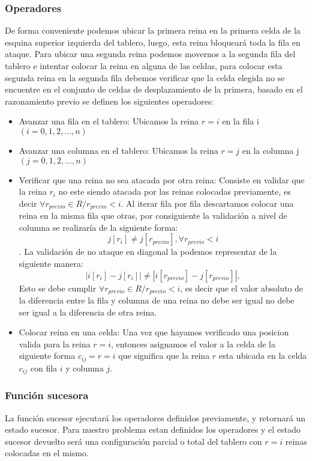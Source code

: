 \documentclass[conference]{IEEEtran}
\begin{document}
\subsubsection{Operadores}\label{AA_4}
De forma conveniente podemos ubicar la primera reina en la primera celda de la esquina superior izquierda del tablero, luego, esta reina bloqueará toda la fila en ataque. Para ubicar una segunda reina podemos movernos a la segunda fila del tablero e intentar colocar la reina en alguna de las celdas, para colocar esta segunda reina en la segunda fila debemos verificar que la celda elegida no se encuentre en el conjunto de celdas de desplazamiento de la primera, basado en el razonamiento previo se definen los siguientes operadores:
\begin{itemize}
\item Avanzar una fila en el tablero: Ubicamos la reina $r=i$ en la fila i $(i = 0, 1, 2,..., n)$
\item Avanzar una columna en el tablero: Ubicamos la reina $r=j$ en la columna j $(j = 0, 1, 2,..., n)$
\item Verificar que una reina no sea atacada por otra reina: Consiste en validar que la reina $r_i$ no este siendo atacada por las reinas colocadas previamente, es decir $\forall r_{previo} \in R / r_{previo}<i$. Al iterar fila por fila descartamos colocar una reina en la misma fila que otras, por consiguiente la validación a nivel de columna se realizaría de la siguiente forma: $$j[r_i] \neq j[r_{previo}], \forall r_{previo}<i$$. La validación de no ataque en diagonal la podemos representar de la siguiente manera: $$|i[r_i]-j[r_i]| \neq |i[r_{previo}]-j[r_{previo}]|,$$ Esto se debe cumplir $\forall r_{previo} \in R / r_{previo}<i$, es decir que el valor absoluto de la diferencia entre la fila y columna de una reina no debe ser igual no debe ser igual a la diferencia de otra reina.
\item Colocar reina en una celda: Una vez que hayamos verificado una posicion valida para la reina $r=i$, entonces asignamos el valor a la celda de la siguiente forma $c_{ij} = r = i$ que significa que la reina $r$ esta ubicada en la celda $c_{ij}$ con fila $i$ y columna $j$.
\end{itemize}

\subsubsection{Función sucesora}\label{AA_5}
La función sucesor ejecutará los operadores definidos previamente, y retornará un estado sucesor\cite{r2}. Para nuestro problema estan definidos los operadores y el estado sucesor devuelto será una configuración parcial o total del tablero con $r=i$ reinas colocadas en el mismo.
\end{document}
